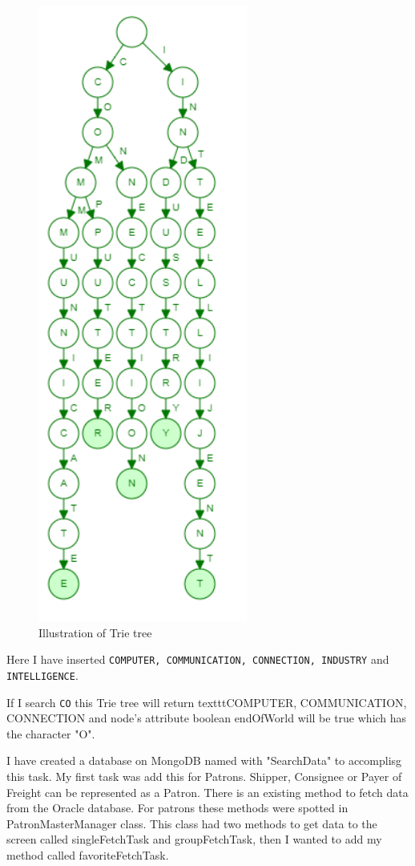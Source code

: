 \documentclass[12pt,a4paper]{report}
\begin{document}
\begin{figure}[H]
\center
\includegraphics[scale=1]{TrieTree.png}
  \caption{Illustration of Trie tree}
  \label{fig:TrieTree}
\end{figure}

Here I have inserted \texttt{COMPUTER, COMMUNICATION, CONNECTION, INDUSTRY} and \texttt{INTELLIGENCE}. 

If I search \texttt{CO} this Trie tree will return texttt{COMPUTER, COMMUNICATION, CONNECTION} and node's attribute boolean endOfWorld will be true which has the character "O". 

I have created a database on MongoDB named with "SearchData" to accomplisg this task. My first task was add this for Patrons. Shipper, Consignee or Payer of Freight can be represented as a Patron. There is an existing method to fetch data from the Oracle database. For patrons these methods were spotted in PatronMasterManager class. This class had two methods to get data to the screen called singleFetchTask and groupFetchTask, then I wanted to add my method called favoriteFetchTask. 
\end{document}
